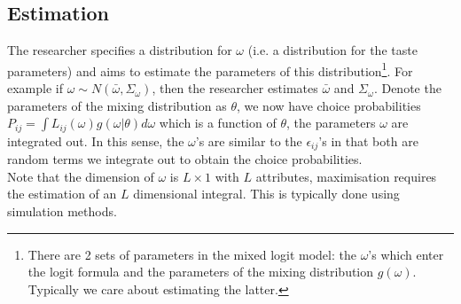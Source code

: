 \documentclass[DIV=14,titlepage=false]{scrreprt}
\begin{document}
\subsection{Estimation}
The researcher specifies a distribution for $\omega$ (i.e. a distribution for the taste parameters) and aims to estimate the parameters of this distribution\footnote{There are 2 sets of parameters in the mixed logit model: the $\omega$'s which enter the logit formula and the parameters of the mixing distribution $g(\omega)$. Typically we care about estimating the latter.}. For example if $\omega \sim N(\bar \omega, \Sigma_\omega)$, then the researcher estimates $\bar \omega$ and $\Sigma_\omega$. Denote the parameters of the mixing distribution as $\theta$, we now have choice probabilities $P_{ij} = \int L_{ij}(\omega)g(\omega|\theta)d\omega$ which is a function of $\theta$, the parameters $\omega$ are integrated out. In this sense, the $\omega$'s are similar to the $\epsilon_{ij}$'s in that both are random terms we integrate out to obtain the choice probabilities.\\
Note that the dimension of $\omega$ is $L \times 1$ with $L$ attributes, maximisation requires the estimation of an $L$ dimensional integral. This is typically done using simulation methods.
\end{document}
